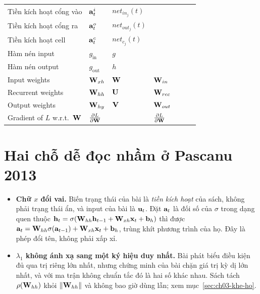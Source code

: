 \begin{tabular}{@{}lllllll@{}}
Tiền kích hoạt cổng vào & \(\mathbf{a}^{i}_t\) & \(net_{in_j}(t)\) & & & & \\
Tiền kích hoạt cổng ra & \(\mathbf{a}^{o}_t\) & \(net_{out_j}(t)\) & & & & \\
Tiền kích hoạt cell & \(\mathbf{a}^{c}_t\) & \(net_{c_j}(t)\) & & & & \\
Hàm nén input & \(g_{\mathrm{in}}\) & \(g\) & & & & \\
Hàm nén output & \(g_{\mathrm{out}}\) & \(h\) & & & & \\
\midrule
Input weights & \(\mathbf{W}_{xh}\) & \(\mathbf{W}\) & \(\mathbf{W}_{in}\) & & & \\
Recurrent weights & \(\mathbf{W}_{hh}\) & \(\mathbf{U}\) & \(\mathbf{W}_{rec}\) & & & \\
Output weights & \(\mathbf{W}_{hy}\) & \(\mathbf{V}\) & \(\mathbf{W}_{out}\) & & & \\
\midrule
Gradient of \(L\) w.r.t.\ \(\mathbf{W}\) & \(\frac{\partial L}{\partial \mathbf{W}}\) & & \(\frac{\partial L}{\partial \mathbf{W}}\) & & & \\
\bottomrule
\end{tabular}
\normalsize

\vspace{1em}
\section{Hai chỗ dễ đọc nhầm ở Pascanu 2013}
\label{sec:app-a-pascanu}

\begin{itemize}
  \item \textbf{Chữ \(x\) đổi vai.} Biến trạng thái của bài là
    \emph{tiền kích hoạt} của sách, không phải trạng thái ẩn, và input của bài
    là \(\mathbf{u}_t\). Đặt \(\mathbf{a}_t\) là đối số của \(\sigma\) trong
    dạng quen thuộc \(\mathbf{h}_t = \sigma(\mathbf{W}_{hh}\mathbf{h}_{t-1} + \mathbf{W}_{xh}\mathbf{x}_t + \mathbf{b}_h)\)
    thì được \(\mathbf{a}_t = \mathbf{W}_{hh}\sigma(\mathbf{a}_{t-1}) + \mathbf{W}_{xh}\mathbf{x}_t + \mathbf{b}_h\),
    trùng khít phương trình của họ. Đây là phép đổi tên, không phải xấp xỉ.
  \item \textbf{\(\lambda_1\) không ánh xạ sang một ký hiệu duy nhất.} Bài
    phát biểu điều kiện đủ qua trị riêng lớn nhất, nhưng chứng minh của bài chặn
    giá trị kỳ dị lớn nhất, và với ma trận không chuẩn tắc đó là hai số khác
    nhau. Sách tách \(\rho(\mathbf{W}_{hh})\) khỏi \(\lVert \mathbf{W}_{hh} \rVert\) và
    không bao giờ dùng lẫn; xem mục~\ref{sec:ch03-khe-ho}.
\end{itemize}

